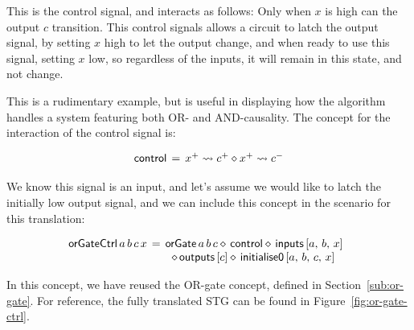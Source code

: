 \documentclass[british,conference,compsoc]{IEEEtran}
\begin{document}
This is the control signal, and interacts as follows:
Only when $x$ is high can the output $c$ transition. This control signals
allows a circuit to latch the output signal, by setting $x$ high to let
the output change, and when ready to use this signal, setting $x$ low,
so regardless of the inputs, it will remain in this state, and not change.

This is a rudimentary example, but is useful in displaying how the algorithm
handles a system featuring both OR- and AND-causality. The concept for 
the interaction of the control signal is:

\[
\begin{array}{lcl}
\mathsf{control}&\hspace{-2mm}=&\hspace{-2mm}x^{+} \rightsquigarrow c^{+} \diamond x^{+} \rightsquigarrow c^{-} 
\end{array}
\]

We know this signal is an input, and let's assume we would like to latch
the initially low output signal, and we can include this concept in the 
scenario for this translation:

\[
\begin{array}{lcl}
\hspace{-2mm}\mathsf{orGateCtrl}\,  a \, b \, c \, x &\hspace{-2mm}=&\hspace{-2mm}\mathsf{orGate}\, a\, b\, c \diamond\, \mathsf{control}
\diamond\, \mathsf{inputs}\, [a,\, b,\, x] \\
&& \diamond \, \mathsf{outputs} \,  [c] \diamond\, \mathsf{initialise0}\, [a,\, b,\, c,\, x]
\end{array}
\]

In this concept, we have reused the OR-gate concept, defined in Section~\ref{sub:or-gate}. 
For reference, the fully translated STG can be found in Figure~\ref{fig:or-gate-ctrl}.

\end{document}
